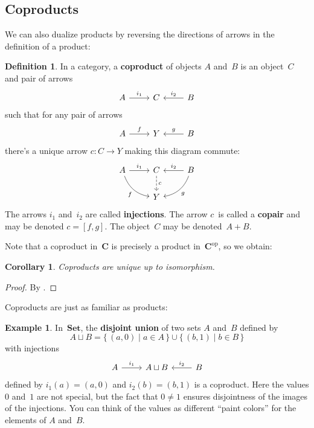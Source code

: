 \documentclass[letterpaper,12pt]{article}
\newcommand{\union}{\cup}
\newcommand{\dunion}{\sqcup}
\newcommand{\cat}[1]{\mathbf{#1}}
\newcommand{\dual}[1]{#1^{\mathrm{op}}}
\newcommand{\Set}{\cat{Set}}
\newcommand{\copair}[2]{[{#1},{#2}]}
\newcommand{\textdefn}{\textbf}
\theoremstyle{definition}
\newtheorem{defn}[equation]{Definition}
\newtheorem{exmp}[equation]{Example}
\theoremstyle{plain}
\newtheorem{cor}[equation]{Corollary}
\numberwithin{equation}{section}
\begin{document}
\subsection{Coproducts}
We can also dualize products by reversing the directions of arrows in the definition of a product:
\begin{defn}
In a category, a \textdefn{coproduct} of objects \(A\) and~\(B\) is an object~\(C\) and pair of arrows
\begin{equation}
\begin{tikzcd}
A \ar[r,"i_1"] & C & B \ar[l,"i_2"']
\end{tikzcd}
\label{cd:coproduct}
\end{equation}
such that for any pair of arrows
\begin{equation*}
\begin{tikzcd}
A \ar[r,"f"] & Y & B \ar[l,"g"']
\end{tikzcd}
\end{equation*}
there's a unique arrow \(c:C\to Y\) making this diagram commute:
\begin{equation}
\begin{tikzcd}
A \ar[rd,bend right,"f"'] \ar[r,"i_1"] & C \ar[d,dashed,"c"] & B \ar[l,"i_2"'] \ar[ld,bend left,"g"] \\
 & Y &
\end{tikzcd}
\label{cd:coproductump}
\end{equation}
The arrows \(i_1\) and~\(i_2\) are called \textdefn{injections}. The arrow \(c\)~is called a \textdefn{copair} and may be denoted \(c=\copair{f}{g}\). The object~\(C\) may be denoted~\(A+B\).
\end{defn}
\noindent Note that a coproduct in~\(\cat{C}\) is precisely a product in~\(\dual{\cat{C}}\), so we obtain:
\begin{cor}
Coproducts are unique up to isomorphism.
\end{cor}
\begin{proof}
By .
\end{proof}

\noindent Coproducts are just as familiar as products:
\begin{exmp}
In~\(\Set\), the \textdefn{disjoint union} of two sets \(A\) and~\(B\) defined by
\[A\dunion B=\{\,(a,0)\mid a\in A\,\}\union\{\,(b,1)\mid b\in B\,\}\]
with injections
\begin{equation*}
\begin{tikzcd}
A \ar[r,"i_1"] & A\dunion B & B \ar[l,"i_2"']
\end{tikzcd}
\end{equation*}
defined by \(i_1(a)=(a,0)\) and \(i_2(b)=(b,1)\) is a coproduct. Here the values \(0\) and~\(1\) are not special, but the fact that \(0\ne 1\) ensures disjointness of the images of the injections. You can think of the values as different ``paint colors'' for the elements of \(A\) and~\(B\).
\end{exmp}
\end{document}
